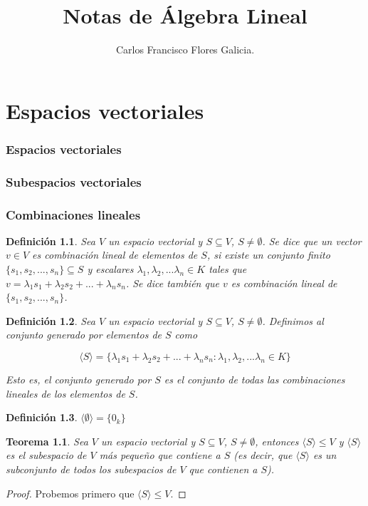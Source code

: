 \documentclass{book}
\title{Notas de Álgebra Lineal}
\author{Carlos Francisco Flores Galicia.}
\date{}
\newtheorem{theorem}{Teorema}
\newtheorem{definition}{Definición}
\begin{document}
\maketitle

\chapter{Espacios vectoriales}
\subsection{Espacios vectoriales}
\subsection{Subespacios vectoriales}
\subsection{Combinaciones lineales}

\begin{definition}
Sea $V$ un espacio vectorial y $S \subseteq V$, $S \neq \emptyset$. Se dice que un vector $v \in V$ es combinación lineal de elementos de $S$, si existe un conjunto finito $\{s_1,s_2,...,s_n\}\subseteq S$ y escalares $\lambda_1,\lambda_2,...\lambda_n \in K$ tales que $v=\lambda_1 s_1+\lambda_2 s_2+...+\lambda_n s_n$. Se dice también que $v$ es combinación lineal de $\{s_1,s_2,...,s_n\}$.
\end{definition}

\begin{definition}
Sea $V$ un espacio vectorial y $S \subseteq V$, $S \neq \emptyset$. Definimos al conjunto generado por elementos de $S$ como

\begin{equation}
\langle S \rangle = \{\lambda_1 s_1+\lambda_2 s_2+...+\lambda_n s_n : \lambda_1,\lambda_2,...\lambda_n \in K \}
\end{equation}

Esto es, el conjunto generado por $S$ es el conjunto de todas las combinaciones lineales de los elementos de $S$.
\end{definition}

\begin{definition}
$\langle \emptyset \rangle=\{0_k\}$
\end{definition}

\begin{theorem}
Sea $V$ un espacio vectorial y $S \subseteq V$, $S \neq \emptyset$, entonces $\langle S \rangle \leq V$ y $\langle S \rangle$ es el subespacio de $V$ más pequeño que contiene a $S$ (es decir, que $\langle S \rangle$ es un subconjunto de todos los subespacios de $V$ que contienen a $S$).
\end{theorem}
\begin{proof}
Probemos primero que $\langle S \rangle \leq V$. 
\end{proof}
\end{document}
